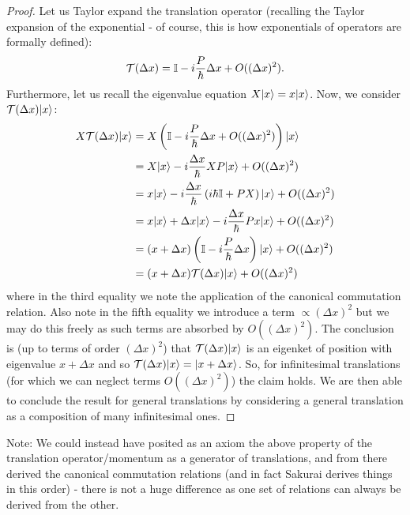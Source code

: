 \begin{proof}
    Let us Taylor expand the translation operator (recalling the Taylor expansion of the exponential - of course, this is how exponentials of operators are formally defined):
    \begin{equation}
        \mathcal{T}(\Delta x) = \mathbb{I} - i\frac{P}{\hbar}\Delta x + O((\Delta x)^2).
    \end{equation}
    Furthermore, let us recall the eigenvalue equation $X\lvert x \rangle = x\lvert x \rangle$. Now, we consider $\mathcal{T}(\Delta x)\lvert x \rangle$:
    \begin{equation}
        \begin{split}
            X\mathcal{T}(\Delta x)\lvert x \rangle &= X\left(\mathbb{I} - i\frac{P}{\hbar}\Delta x + O((\Delta x)^2)\right)\lvert x \rangle
            \\ &= X\lvert x \rangle - i\frac{\Delta x}{\hbar}XP\lvert x \rangle + O((\Delta x)^2)
            \\ &= x\lvert x \rangle - i\frac{\Delta x}{\hbar}\left(i\hbar \mathbb{I} + PX\right)\lvert x \rangle + O((\Delta x)^2)
            \\ &= x\lvert x \rangle + \Delta x\lvert x \rangle - i\frac{\Delta x}{\hbar}P x\lvert x \rangle + O((\Delta x)^2)
            \\ &= (x + \Delta x)\left(\mathbb{I} - i\frac{P}{\hbar}\Delta x\right)\lvert x \rangle + O((\Delta x)^2)
            \\ &=  (x + \Delta x)\mathcal{T}(\Delta x)\lvert x \rangle + O((\Delta x)^2)
        \end{split}
    \end{equation}
    where in the third equality we note the application of the canonical commutation relation. Also note in the fifth equality we introduce a term $\propto (\Delta x)^2$ but we may do this freely as such terms are absorbed by $O((\Delta x)^2)$. The conclusion is (up to terms of order $(\Delta x)^2$) that $\mathcal{T}(\Delta x)\lvert x \rangle$ is an eigenket of position with eigenvalue $x + \Delta x$  and so $\mathcal{T}(\Delta x)\lvert x \rangle = \lvert x + \Delta x \rangle$. So, for infinitesimal translations (for which we can neglect terms $O((\Delta x)^2)$) the claim holds. We are then able to conclude the result for general translations by considering a general translation as a composition of many infinitesimal ones.
\end{proof}

Note: We could instead have posited as an axiom the above property of the translation operator/momentum as a generator of translations, and from there derived the canonical commutation relations (and in fact Sakurai derives things in this order) - there is not a huge difference as one set of relations can always be derived from the other.

